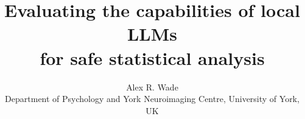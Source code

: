 \documentclass[11pt,a4paper]{article}
\title{Evaluating the capabilities of local LLMs\\for safe statistical analysis}
\author{Alex R. Wade\\[2pt]
  \small Department of Psychology and York Neuroimaging Centre, University of York, UK\\
  \small \code{alex.wade@york.ac.uk}}
\begin{document}
\maketitle

\begin{abstract}

\end{abstract}

















\appendix

\end{document}
